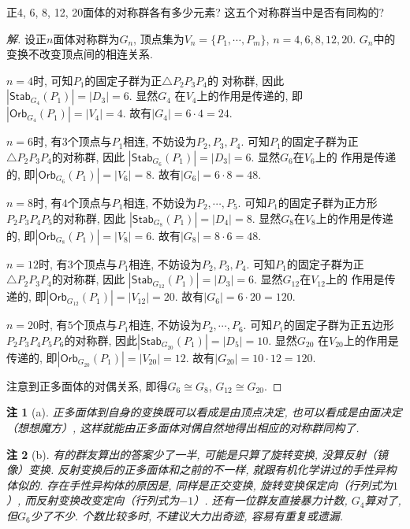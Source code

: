 \documentclass[12pt, a4paper, fontset=windows]{ctexart}
\newcommand{\Orb}{\mathsf{Orb}}
\newcommand{\Stab}{\mathsf{Stab}}
\newcommand{\abs}[1]{\left|{#1}\right|}
\newcommand{\isom}{\cong} %
\newcommand{\kh}[1]{（{#1}）} %
\newtheorem*{remark}{注}
\newenvironment{solution}{\begin{proof}[解]}{\end{proof}}
\begin{document}
正4, 6, 8, 12, 20面体的对称群各有多少元素? 
这五个对称群当中是否有同构的? 

\begin{solution}
设正$n$面体对称群为$G_n$, 顶点集为$V_n=\{P_1,\cdots,P_m\}$, 
$n=4,6,8,12,20$. $G_n$中的变换不改变顶点间的相连关系. 

$n=4$时, 可知$P_1$的固定子群为正$\triangle P_2P_3P_4$的
对称群, 因此$\abs{\Stab_{G_4}(P_1)}=\abs{D_3}=6$. 显然$G_4$
在$V_4$上的作用是传递的, 即$\abs{\Orb_{G_4}(P_1)}=\abs{V_4}=4$. 故有$\abs{G_4}=6\cdot 4=24$. 

$n=6$时, 有$3$个顶点与$P_1$相连, 不妨设为$P_2,P_3,P_4$. 
可知$P_1$的固定子群为正$\triangle P_2P_3P_4$的对称群, 因此
$\abs{\Stab_{G_6}(P_1)}=\abs{D_3}=6$. 显然$G_6$在$V_6$上的
作用是传递的, 即$\abs{\Orb_{G_6}(P_1)}=\abs{V_6}=8$. 故有$\abs{G_6}=6\cdot 8=48$. 

$n=8$时, 有$4$个顶点与$P_1$相连, 不妨设为$P_2,\cdots,P_5$. 
可知$P_1$的固定子群为正方形$P_2P_3P_4P_5$的对称群, 因此
$\abs{\Stab_{G_8}(P_1)}=\abs{D_4}=8$. 显然$G_8$在$V_8$上的作用是传递的, 
即$\abs{\Orb_{G_8}(P_1)}=\abs{V_8}=6$. 故有$\abs{G_8}=8\cdot 6=48$. 

$n=12$时, 有$3$个顶点与$P_1$相连, 不妨设为$P_2,P_3,P_4$. 
可知$P_1$的固定子群为正$\triangle P_2P_3P_4$的对称群, 因此
$\abs{\Stab_{G_{12}}(P_1)}=\abs{D_3}=6$. 显然$G_{12}$在$V_{12}$上的
作用是传递的, 即$\abs{\Orb_{G_{12}}(P_1)}=\abs{V_{12}}=20$. 故有$\abs{G_6}=6\cdot 20=120$. 

$n=20$时, 有$5$个顶点与$P_1$相连, 不妨设为$P_2,\cdots,P_6$. 
可知$P_1$的固定子群为正五边形$P_2P_3P_4P_5P_6$的对称群, 
因此$\abs{\Stab_{G_{20}}(P_1)}=\abs{D_5}=10$. 显然$G_{20}$
在$V_{20}$上的作用是传递的, 即$\abs{\Orb_{G_{20}}(P_1)}=\abs{V_{20}}=12$. 
故有$\abs{G_{20}}=10\cdot 12=120$. 

注意到正多面体的对偶关系, 即得$G_6\isom G_8$, $G_{12}\isom G_{20}$. 
\end{solution}

\begin{remark}[a]
正多面体到自身的变换既可以看成是由顶点决定, 也可以看成是由面决定\kh{想想魔方}, 这样就能由正多面体对偶自然地得出相应的对称群同构了. 
\end{remark}

\begin{remark}[b]
有的群友算出的答案少了一半, 可能是只算了旋转变换, 没算反射\kh{镜像}变换. 
反射变换后的正多面体和之前的不一样, 就跟有机化学讲过的手性异构体似的. 
存在手性异构体的原因是, 同样是正交变换, 旋转变换保定向\kh{行列式为$1$}, 而反射变换改变定向\kh{行列式为$-1$}. 
还有一位群友直接暴力计数, $G_4$算对了, 但$G_6$少了不少. 
个数比较多时, 不建议大力出奇迹, 容易有重复或遗漏. 
\end{remark}
\end{document}
